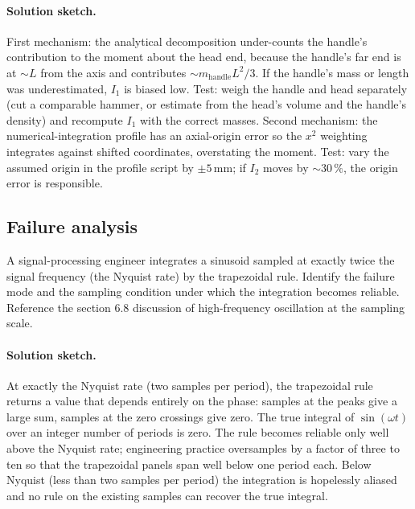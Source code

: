\paragraph{Solution sketch.}
First mechanism: the analytical decomposition under-counts the
handle's contribution to the moment about the head end, because
the handle's far end is at $\sim L$ from the axis and contributes
$\sim m_{\mathrm{handle}} L^{2}/3$. If the handle's mass or length
was underestimated, $I_{1}$ is biased low. Test: weigh the
handle and head separately (cut a comparable hammer, or estimate
from the head's volume and the handle's density) and recompute
$I_{1}$ with the correct masses. Second mechanism: the
numerical-integration profile has an axial-origin error so the
$x^{2}$ weighting integrates against shifted coordinates,
overstating the moment. Test: vary the assumed origin in the
profile script by $\pm 5\,\text{mm}$; if $I_{2}$ moves by $\sim
30\,\%$, the origin error is responsible.

\subsection*{Failure analysis}

\begin{exercise}
A signal-processing engineer integrates a sinusoid sampled at
exactly twice the signal frequency (the Nyquist rate) by the
trapezoidal rule. Identify the failure mode and the sampling
condition under which the integration becomes reliable. Reference
the section 6.8 discussion of high-frequency oscillation at the
sampling scale.
\end{exercise}

\paragraph{Solution sketch.}
At exactly the Nyquist rate (two samples per period), the
trapezoidal rule returns a value that depends entirely on the
phase: samples at the peaks give a large sum, samples at the
zero crossings give zero. The true integral of $\sin(\omega t)$
over an integer number of periods is zero. The rule becomes
reliable only well above the Nyquist rate; engineering practice
oversamples by a factor of three to ten so that the trapezoidal
panels span well below one period each. Below Nyquist (less than
two samples per period) the integration is hopelessly aliased and
no rule on the existing samples can recover the true integral.


